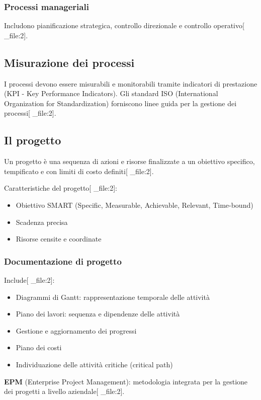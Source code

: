 \documentclass[12pt,a4paper]{article}
\begin{document}
\subsubsection{Processi manageriali}
Includono pianificazione strategica, controllo direzionale e controllo operativo[ _file:2].

\subsection{Misurazione dei processi}
I processi devono essere misurabili e monitorabili tramite indicatori di prestazione (KPI - Key Performance Indicators). Gli standard ISO (International Organization for Standardization) forniscono linee guida per la gestione dei processi[ _file:2].

\subsection{Il progetto}
Un progetto è una sequenza di azioni e risorse finalizzate a un obiettivo specifico, tempificato e con limiti di costo definiti[ _file:2].

Caratteristiche del progetto[ _file:2]:
\begin{itemize}
    \item Obiettivo SMART (Specific, Measurable, Achievable, Relevant, Time-bound)
    \item Scadenza precisa
    \item Risorse censite e coordinate
\end{itemize}

\subsubsection{Documentazione di progetto}
Include[ _file:2]:
\begin{itemize}
    \item Diagrammi di Gantt: rappresentazione temporale delle attività
    \item Piano dei lavori: sequenza e dipendenze delle attività
    \item Gestione e aggiornamento dei progressi
    \item Piano dei costi
    \item Individuazione delle attività critiche (critical path)
\end{itemize}

\textbf{EPM} (Enterprise Project Management): metodologia integrata per la gestione dei progetti a livello aziendale[ _file:2].
\end{document}

